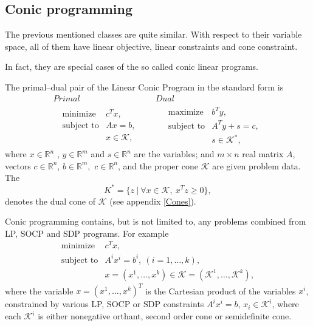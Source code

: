 \documentclass[10pt,oneside]{book}
\theoremstyle{definition}
\begin{document}
\subsection{Conic programming}

The previous mentioned classes are quite similar. 
With respect to their variable space, all of them have linear objective, linear constraints and cone constraint.

In fact, they are special cases of the so called conic linear programs.




\label{defConeProg}
The primal--dual pair of the Linear Conic Program in the standard form is  
\begin{equation}
\label{coneProg} 
\begin{array}{cc}
Primal & Dual \\
\ \ \ \begin{array}{ll}
\mbox{minimize} & c^Tx,\\
\mbox{subject to}& Ax = b,\\
& x \in \mathcal{K},
\end{array} 
 \ \ \ \ \ & \ \ \ \ \ 
 \begin{array}{ll}
\mbox{maximize} & b^Ty,\\
\mbox{subject to}& A^Ty + s = c,\\
& s \in \mathcal{K}^*,
\end{array}
\end{array}
\tag{Conic Program}
\end{equation}
where $x\in \mathbb{R}^n$ , $y\in \mathbb{R}^m$ and $s\in \mathbb{R}^n$ are the variables; and $m\times n$ real matrix $A$, vectors $c\in \mathbb{R}^n$, $b\in \mathbb{R}^{m},$ $c\in \mathbb{R}^n$, and the proper cone $\mathcal{K}$ are given problem data. The 
\begin{equation}
{K}^* = \{z\ |\ \forall x\in\mathcal{K}, \ x^Tz\geq 0\},
\end{equation} 
denotes the dual cone of $\mathcal{K}$ (see appendix \ref{Cones}).

Conic programming contains, but is not limited to, any problems combined from LP, SOCP and SDP programs. 
For example 
\begin{equation}
\begin{array}{ll}
\mbox{minimize} & c^Tx,\\
\mbox{subject to}&A^ix^i=b^i, \ (i = 1,\dots ,k),\\
& x=(x^1,\dots ,x^k) \in \mathcal{K} = (\mathcal{K}^1,\dots ,\mathcal{K}^k),
\end{array} 
\end{equation}
where the variable $x=(x^1, \dots, x^k)^T$ is the Cartesian product of the variables $x^i$, constrained by various LP, SOCP or SDP constraints 
$A^ix^i=b$, $x_i\in \mathcal{K}^i$, where each $\mathcal{K}^i$ is either nonegative orthant, second order cone or semidefinite cone.
\end{document}
